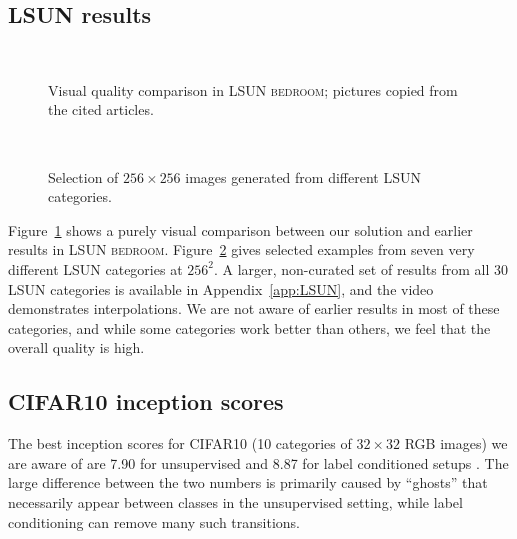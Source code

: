 \subsection{LSUN results}

\begin{figure}
\hfill
\hfill
\\
\hfill
{}\hfill
{}
\caption{Visual quality comparison in \textsc{LSUN bedroom}; pictures copied from the cited articles.}
\label{fig:bedroomqualitycomparison}
\end{figure}

\begin{figure}
\centering

\tiny
{}\hfill
{}\hfill
{}\hfill
{}\hfill
{}\hfill
{}\hfill
{}\\
\caption{Selection of $256\times256$ images generated from different LSUN categories.}
\label{fig:LSUNsummary}
\end{figure}

Figure~\ref{fig:bedroomqualitycomparison} shows a purely visual comparison between our solution and earlier results in \textsc{LSUN bedroom}. 
Figure~\ref{fig:LSUNsummary} gives selected examples from seven very different \textsc{LSUN} categories at $256^2$. A larger, non-curated set of results from all 30 \textsc{LSUN} categories is available in Appendix~\ref{app:LSUN}, and the video demonstrates interpolations. We are not aware of earlier results in most of these categories, and while some categories work better than others, we feel that the overall quality is high.

\subsection{CIFAR10 inception scores}
\label{sec:cifar10}
The best inception scores for \textsc{CIFAR10} (10 categories of $32\times32$ RGB images) we are aware of are 7.90 for unsupervised and 8.87 for label conditioned setups \citep{Grinblat2017}. The large difference between the two numbers is primarily caused by ``ghosts'' that necessarily appear between classes in the unsupervised setting, while label conditioning can remove many such transitions.

